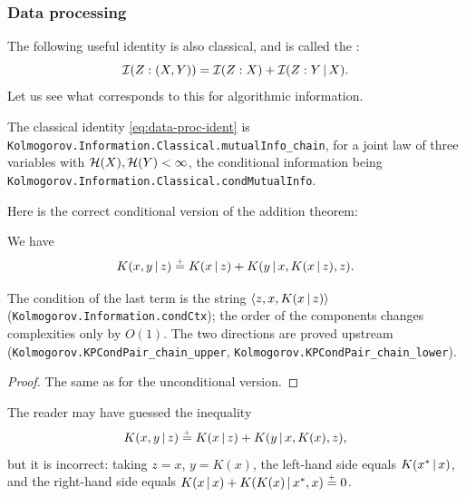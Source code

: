 \subsubsection{Data processing}
The following useful identity is also classical, and is called the
:
 \begin{equation}\label{eq:data-proc-ident}
   \mathcal{I}(Z : (X, Y)) = \mathcal{I}(Z : X) + \mathcal{I}(Z : Y \,\vert\, X).
 \end{equation}
Let us see what corresponds to this for algorithmic information.

\begin{formalization}
The classical identity \eqref{eq:data-proc-ident} is
\texttt{Kolmogorov.Information.Classical.mutualInfo\_chain}, for a joint law of three
variables with \( \mathcal{H}(X), \mathcal{H}(Y) < \infty \), the conditional information being
\texttt{Kolmogorov.Information.Classical.condMutualInfo}.
\end{formalization}

Here is the correct conditional version of the addition theorem:
 \begin{theorem}
  \label{thm:g3.1.7}
  \leanok
We have
 \begin{equation}\label{eq:cond-addit}
  K(x, y \,\vert\, z) \stackrel{{}_+}{=} K(x \,\vert\, z) + K(y \,\vert\, x, K(x \,\vert\, z), z).
 \end{equation}
 \end{theorem}

\begin{formalization}
The condition of the last term is the string \( {\mathopen\langle z, x, K(x \,\vert\, z)\mathclose\rangle} \)
(\texttt{Kolmogorov.Information.condCtx}); the order of the components changes complexities
only by \( O(1) \). The two directions are proved upstream
(\texttt{Kolmogorov.KPCondPair\_chain\_upper}, \texttt{Kolmogorov.KPCondPair\_chain\_lower}).
\end{formalization}

 \begin{proof}
  \leanok
The same as for the unconditional version.
 \end{proof}

 \begin{remark}
  \label{rem:g3.1.13}
The reader may have guessed the inequality
 \[
  K(x, y \,\vert\, z) \stackrel{{}_+}{=} K(x \,\vert\, z) + K(y \,\vert\, x, K(x), z),
 \]
but it is incorrect: taking \( z = x \), \( y = K(x) \),
the left-hand side equals \( K(x^{*} \,\vert\, x) \), and the right-hand side
equals \( K(x \,\vert\, x) + K(K(x) \,\vert\, x^{*}, x) \stackrel{{}_+}{=} 0 \).
 \end{remark}


